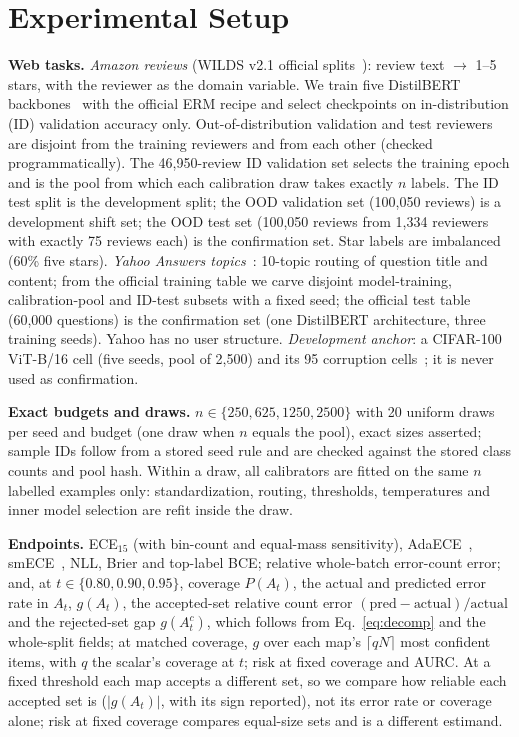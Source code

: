 \documentclass[sigconf,anonymous,review]{acmart}
\begin{document}
\section{Experimental Setup}
\label{sec:setup}
\textbf{Web tasks.} \emph{Amazon reviews} (WILDS v2.1 official
splits~\cite{koh2021wilds}): review text $\to$ 1--5 stars, with the
reviewer as the domain variable. We train five DistilBERT
backbones~\cite{sanh2019distilbert} with the official ERM recipe and
select checkpoints on in-distribution (ID) validation accuracy only.
Out-of-distribution validation and test reviewers are disjoint from the
training reviewers and from each other (checked programmatically). The
46{,}950-review ID validation set selects the training epoch and is the
pool from which each calibration draw takes exactly $n$ labels. The ID
test split is the development split; the OOD validation set (100{,}050
reviews) is a development shift set; the OOD test set (100{,}050 reviews
from 1{,}334 reviewers with exactly 75 reviews each) is the confirmation
set. Star labels are imbalanced (60\% five stars). \emph{Yahoo Answers
topics}~\cite{zhang2015character}: 10-topic routing of question title and
content; from the official training table we carve disjoint
model-training, calibration-pool and ID-test subsets with a fixed seed;
the official test table (60{,}000 questions) is the confirmation set
(one DistilBERT architecture, three training seeds). Yahoo has no user
structure. \emph{Development
anchor}: a CIFAR-100 ViT-B/16 cell (five seeds, pool of 2{,}500) and its
95 corruption cells~\cite{hendrycks2019benchmarking}; it is never used as
confirmation.

\textbf{Exact budgets and draws.} $n\in\{250,625,1250,2500\}$ with 20
uniform draws per seed and budget (one draw when $n$ equals the pool),
exact sizes asserted; sample IDs follow from a stored seed rule and are
checked against the stored class counts and pool hash. Within a draw, all calibrators are fitted on the same $n$ labelled
examples only: standardization, routing,
thresholds, temperatures and inner model selection are refit inside the
draw.

\textbf{Endpoints.} ECE$_{15}$ (with bin-count and equal-mass
sensitivity), AdaECE~\cite{nixon2019measuring},
smECE~\cite{blasiok2023smooth}, NLL, Brier and top-label BCE; relative
whole-batch error-count error; and, at $t\in\{0.80,0.90,0.95\}$, coverage
$P(A_t)$, the actual and predicted error rate in $A_t$, $g(A_t)$, the
accepted-set relative count error $(\text{pred}-\text{actual})/\text{actual}$
and the rejected-set gap $g(A_t^c)$, which follows from
Eq.~\eqref{eq:decomp} and the whole-split fields; at matched
coverage, $g$ over each map's $\lceil qN\rceil$ most confident items, with
$q$ the scalar's coverage at $t$; risk at fixed coverage and AURC. At a fixed threshold each map accepts a different
set, so we compare how reliable each accepted set is ($|g(A_t)|$, with
its sign reported), not its error rate or coverage alone; risk at fixed
coverage compares equal-size sets and is a different estimand.
\end{document}
